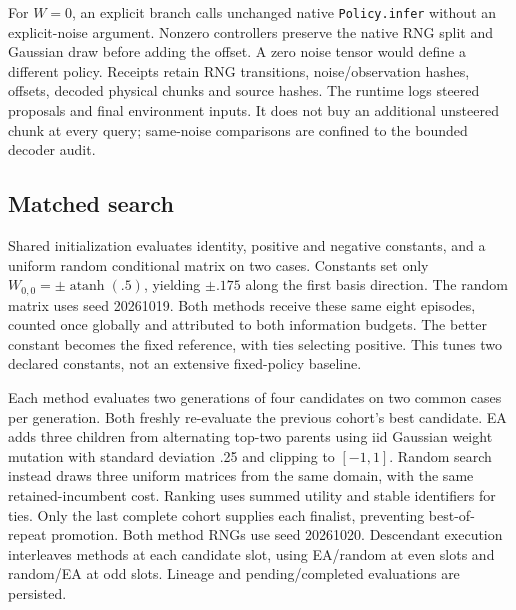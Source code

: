 \documentclass[sigconf,dvipsnames,balance=false]{acmart}
\begin{document}
For $W=0$, an explicit branch calls unchanged native \texttt{Policy.infer} without
an explicit-noise argument. Nonzero controllers preserve the native RNG split and
Gaussian draw before adding the offset. A zero noise tensor would define a different
policy. Receipts retain RNG transitions, noise/observation hashes, offsets, decoded
physical chunks and source hashes. The runtime logs steered proposals and final
environment inputs. It does not buy an additional unsteered chunk at every query;
same-noise comparisons are confined to the bounded decoder audit.

\subsection{Matched search}
Shared initialization evaluates identity, positive and negative constants, and a
uniform random conditional matrix on two cases. Constants set only
$W_{0,0}=\pm\operatorname{atanh}(.5)$, yielding $\pm.175$ along the first basis
direction. The random matrix uses seed 20261019. Both methods receive these same
eight episodes, counted once globally and attributed to both information budgets.
The better constant becomes the fixed reference, with ties selecting positive.
This tunes two declared constants, not an extensive fixed-policy baseline.

Each method evaluates two generations of four candidates on two common cases per
generation. Both freshly re-evaluate the previous cohort's best candidate. EA adds
three children from alternating top-two parents using iid Gaussian weight mutation
with standard deviation .25 and clipping to $[-1,1]$. Random search instead draws
three uniform matrices from the same domain, with the same retained-incumbent cost.
Ranking uses summed utility and stable identifiers for ties. Only the last complete
cohort supplies each finalist, preventing best-of-repeat promotion. Both method
RNGs use seed 20261020. Descendant execution interleaves methods at each candidate
slot, using EA/random at even slots and random/EA at odd slots. Lineage and
pending/completed evaluations are persisted.
\end{document}
